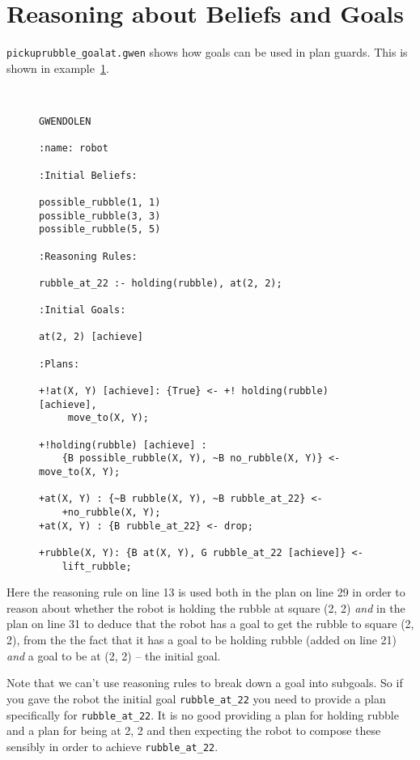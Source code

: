 \section{Reasoning about Beliefs and Goals} 
\texttt{pickuprubble\_goalat.gwen} shows how goals can be used in plan
guards.  This is shown in
example~\ref{code:pickuprubble_goalat}. 
\begin{figure}[htb]
\begin{ourexample}
\label{code:pickuprubble_goalat} \quad \\
\begin{lstlisting}[basicstyle=\sffamily,style=easslisting,language=Gwendolen]
GWENDOLEN

:name: robot

:Initial Beliefs:

possible_rubble(1, 1)
possible_rubble(3, 3)
possible_rubble(5, 5)

:Reasoning Rules:

rubble_at_22 :- holding(rubble), at(2, 2);

:Initial Goals:

at(2, 2) [achieve]

:Plans:

+!at(X, Y) [achieve]: {True} <- +! holding(rubble)[achieve],
     move_to(X, Y);

+!holding(rubble) [achieve] : 
    {B possible_rubble(X, Y), ~B no_rubble(X, Y)} <- move_to(X, Y);

+at(X, Y) : {~B rubble(X, Y), ~B rubble_at_22} <- 
    +no_rubble(X, Y);
+at(X, Y) : {B rubble_at_22} <- drop;

+rubble(X, Y): {B at(X, Y), G rubble_at_22 [achieve]} <- 
    lift_rubble;
\end{lstlisting}
\end{ourexample}
\end{figure}
Here the reasoning rule on
line 13 is used both in the plan on line 29 in order to
reason about whether the robot is holding the rubble at square (2, 2)
\emph{and} in the plan on line 31 to deduce that the robot has a goal
to get the rubble to square (2, 2), from the the fact that it has a
goal to be holding rubble (added on line 21) \emph{and} a goal to be
at (2, 2) -- the initial goal. 

Note that we can't use reasoning
rules to break down a goal
into subgoals.  So if you gave the
robot the initial goal \lstinline{rubble_at_22} you need to provide a
plan specifically for \lstinline{rubble_at_22}.  It is no good
providing a plan for holding rubble and a plan for being at 2, 2 and
then expecting the robot to compose these sensibly in order to achieve
\lstinline{rubble_at_22}. 

